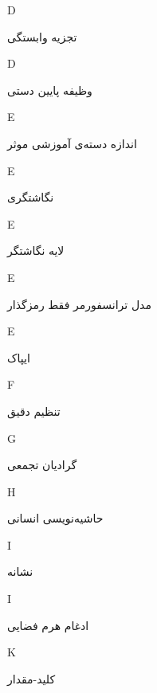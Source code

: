 \begin{center}
D
\end{center}
	 \dotfill 	تجزیه وابستگی \\ 
\begin{center}
D
\end{center}
	 \dotfill 	وظیفه پایین دستی \\ 
\begin{center}
E
\end{center}
	 \dotfill 	اندازه دسته‌ی آموزشی موثر \\ 
\begin{center}
E
\end{center}
	 \dotfill 	نگاشتگری \\ 
\begin{center}
E
\end{center}
	 \dotfill 	لایه نگاشتگر \\ 
\begin{center}
E
\end{center}
	 \dotfill 	 مدل ترانسفورمر فقط رمزگذار \\ 
\begin{center}
E
\end{center}
	 \dotfill 	ایپاک \\ 
\begin{center}
F
\end{center}
	 \dotfill 	تنظیم دقیق \\ 
\begin{center}
G
\end{center}
	 \dotfill 	گرادیان تجمعی \\ 
\begin{center}
H
\end{center}
	 \dotfill 	حاشیه‌نویسی انسانی \\ 
\begin{center}
I
\end{center}
	 \dotfill 	نشانه \\ 
\begin{center}
I
\end{center}
	 \dotfill 	ادغام هرم فضایی \\ 
\begin{center}
K
\end{center}
	 \dotfill 	کلید-مقدار \\ 
